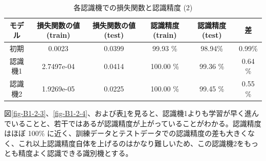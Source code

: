 \documentclass[a4paper,dvipdfmx]{jsarticle}
\begin{document}
\begin{table}[H]
\begin{center}
\caption{各認識機での損失関数と認識精度 (2)}
  \begin{tabular}{|c|c|c||c|c|c|} \hline
    モデル & 損失関数の値(train) & 損失関数の値(test) & 認識精度(train) & 認識精度(test) & 差 \\ \hline \hline
    初期 & 0.0023 & 0.0399 & 99.93 \% & 98.94\% & 0.99\% \\ \hline
    認識機1 & 2.7497e-04 & 0.0414 & 100.00 \% & 99.36 \% & 0.64 \% \\ \hline 
    認識機2 & 1.9269e-05 & 0.0225 & 100.00 \% & 99.45 \% & 0.55 \% \\ \hline
  \end{tabular}
	\label{tableB1-2-2}
\end{center}
\end{table}

図\ref{fig-B1-2-3}、\ref{fig-B1-2-4}、および表\ref{tableB1-2-2}を見ると、認識機1よりも学習が早く進んでいることと、若干ではあるが認識精度が上がっていることがわかる。認識精度はほぼ 100\% に近く、訓練データとテストデータでの認識精度の差も大きくなく、これ以上認識精度自体を上げるのはかなり難しいため、この認識機2をもっとも精度よく認識できる識別機とする。
\end{document}
